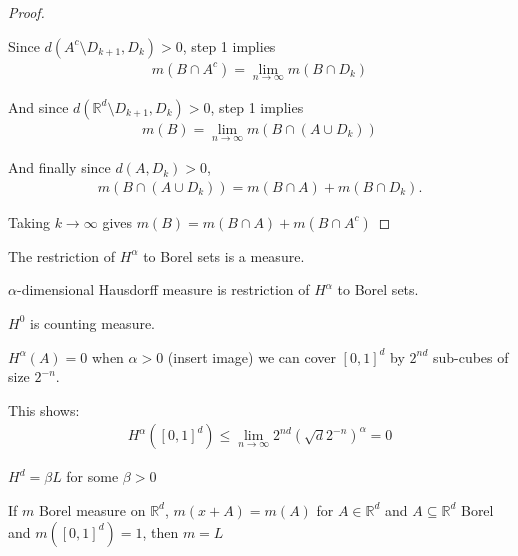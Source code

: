 \begin{proof}
\begin{enumerate}
			Since $d(A^{c} \setminus D_{k+1} , D_k) > 0$, step 1 implies 
			 \begin{align*}
				m(B \cap A^{c}) = \lim_{n \to \infty} m(B \cap D_k)
			\end{align*} 

			And since $d(\mathbb{R}^d \setminus D_{k+1}, D_k ) > 0$, step 1 implies
			\begin{align*}
				m(B ) = \lim_{n \to \infty} m(B \cap (A \cup D_{k}))
			\end{align*} 

			And finally since $d(A, D_{k}) > 0$,
			\begin{align*}
				m(B \cap (A \cup D_{k})) = m(B \cap A) + m(B \cap D_{k}).
			\end{align*} 
	\end{enumerate}

	Taking $k \to \infty$ gives $m(B) = m(B \cap A) + m(B \cap A^{c})$
\end{proof}


\begin{theorem}
	The restriction of $H^{\alpha}$ to Borel sets is a measure.
\end{theorem}


\begin{definition}
	$\alpha$-dimensional Hausdorff measure is restriction of $H^{\alpha}$ to Borel sets.
\end{definition}


\begin{example}
	$H^{0}$ is counting measure.
\end{example}


\begin{example}
	$H^{\alpha} (A) = 0$ when $\alpha > 0$ 
	(insert image) we can cover  $[0,1]^{d}$ by $2^{nd}$ sub-cubes of size $2^{-n}$.

	This shows:
	\begin{align*}
		H^{\alpha} ([0,1]^d) \leq \lim_{n \to \infty} 2^{nd}( \sqrt{d} 2^{-n})^{\alpha} = 0
	\end{align*}
\end{example}

\begin{example}
	$H^{d} = \beta L$ for some $\beta > 0$
\end{example}

\begin{theorem}
	If $m$ Borel measure on $\mathbb{R}^{d}$, $m(x + A) = m(A)$ for $A \in \mathbb{R}^d$ and $A \subseteq \mathbb{R}^d$ Borel and $m([0,1]^{d}) =1$, then $m = L$
\end{theorem}

